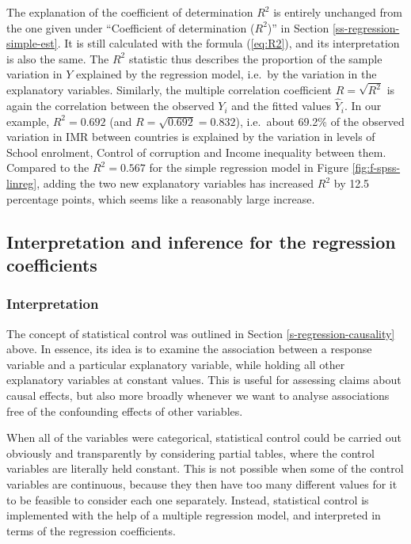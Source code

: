 \documentclass[11pt,a4paper,openany]{book}
\begin{document}
\begin{itemize}
  The explanation of the coefficient of determination \(R^{2}\) is
  entirely unchanged from the one given under ``Coefficient of
  determination (\(R^{2}\))'' in Section \ref{ss-regression-simple-est}.
  It is still calculated with the formula (\ref{eq:R2}), and its
  interpretation is also the same. The \(R^{2}\) statistic thus
  describes the proportion of the sample variation in \(Y\) explained by
  the regression model, i.e.~by the variation in the explanatory
  variables. Similarly, the multiple correlation coefficient
  \(R=\sqrt{R^{2}}\) is again the correlation between the observed
  \(Y_{i}\) and the fitted values \(\hat{Y}_{i}\). In our example,
  \(R^{2}=0.692\) (and \(R=\sqrt{0.692}=0.832\)), i.e.~about 69.2\% of
  the observed variation in IMR between countries is explained by the
  variation in levels of School enrolment, Control of corruption and
  Income inequality between them. Compared to the \(R^{2}=0.567\) for
  the simple regression model in Figure \ref{fig:f-spss-linreg}, adding
  the two new explanatory variables has increased \(R^{2}\) by 12.5
  percentage points, which seems like a reasonably large increase.
\end{itemize}

\subsection{Interpretation and inference for the regression
coefficients}\label{ss-regression-multiple-beta}

\subsubsection*{Interpretation}\label{interpretation}

The concept of statistical control was outlined in Section
\ref{s-regression-causality} above. In essence, its idea is to examine
the association between a response variable and a particular explanatory
variable, while holding all other explanatory variables at constant
values. This is useful for assessing claims about causal effects, but
also more broadly whenever we want to analyse associations free of the
confounding effects of other variables.

When all of the variables were categorical, statistical control could be
carried out obviously and transparently by considering partial tables,
where the control variables are literally held constant. This is not
possible when some of the control variables are continuous, because they
then have too many different values for it to be feasible to consider
each one separately. Instead, statistical control is implemented with
the help of a multiple regression model, and interpreted in terms of the
regression coefficients.
\end{document}
